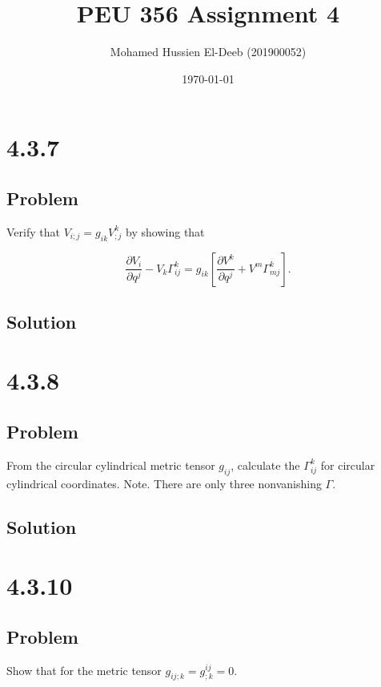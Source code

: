 \documentclass[12pt]{article}
\title{PEU 356 Assignment 4}
\author{Mohamed Hussien El-Deeb (201900052)}
\date{\today}
\begin{document}
\maketitle
\tableofcontents
\hypersetup{linkcolor=RoyalBlue4}

\newpage
\section{4.3.7}

\subsection{Problem}

Verify that \(V_{i ; j}=g_{i k} V_{; j}^k\) by showing that

\[
    \frac{\partial V_i}{\partial q^j}-V_k \Gamma_{i j}^k=g_{i k}\left[\frac{\partial V^k}{\partial q^j}+V^m \Gamma_{m j}^k\right] .
\]

\subsection{Solution}

\newpage
\section{4.3.8}

\subsection{Problem}

From the circular cylindrical metric tensor \(g_{i j}\), calculate the \(\Gamma_{i j}^k\) for circular cylindrical coordinates.
Note. There are only three nonvanishing \(\Gamma\).

\subsection{Solution}

\newpage
\section{4.3.10}

\subsection{Problem}

Show that for the metric tensor \(g_{ij; k} = g^{ij}_{;k} = 0\).
\end{document}
